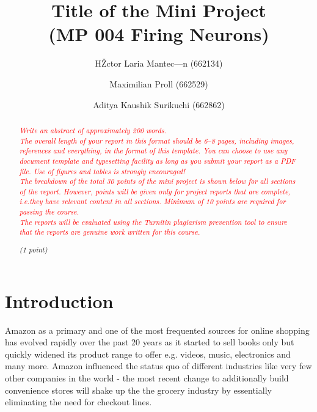 \documentclass[a4paper,11pt]{article}
\begin{document}
\title{Title of the Mini Project\\
\normalsize (MP 004 Firing Neurons)}

\author{HŽctor Laria Mantec—n (662134) \and Maximilian Proll (662529)
  \and Aditya Kaushik Surikuchi (662862)}

\maketitle

\newcommand{\points}[1]{\par\noindent\textit{(#1 points)}}
\newcommand{\onepoint}{\par\noindent\textit{(1 point)}}
\newcommand{\defaulttext}[1]{\textit{\textcolor{red}{#1}}}
\renewcommand{\refname}{}

\begin{abstract}
  \defaulttext{Write an abstract of approximately 200 words. \\
  The overall length of your report in this format should be 6--8
  pages, including images, references and everything, in the format of
  this template.  You can choose to use any document template and
  typesetting facility as long as you submit your report as a PDF file.
  Use of figures and tables is strongly encouraged!\\
  The breakdown of the total 30 points of the mini project is shown
  below for all sections of the report. However, points will be given
  only for project reports that are complete, i.e.\@ they have
  relevant content in all sections.  Minimum of 10 points are required
  for passing the course.  \\
  The reports will be evaluated using the Turnitin plagiarism
  prevention tool to ensure that the reports are genuine work written
  for this course.}
  \onepoint
\end{abstract}

\section{Introduction}

Amazon as a primary and one of the most frequented sources for online shopping has evolved rapidly over the past 20 years as it started to sell books only but quickly widened its product range to offer e.g. videos, music, electronics and many more. Amazon influenced the status quo of different industries like very few other companies in the world - the most recent change to additionally build convenience stores will shake up the the grocery industry by essentially eliminating the need for checkout lines.
\end{document}
